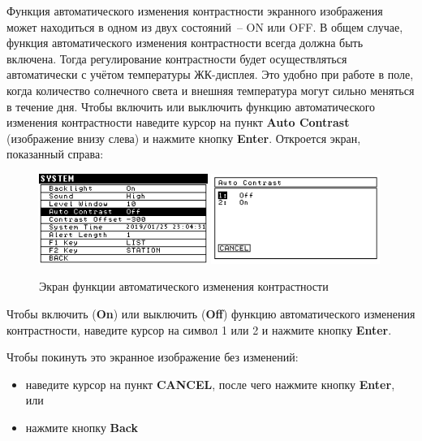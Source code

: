Функция автоматического изменения контрастности экранного изображения может
находиться в одном из двух состояний~-- ON или OFF. В общем случае, функция
автоматического изменения контрастности всегда должна быть включена. Тогда
регулирование контрастности будет осуществляться автоматически с учётом
температуры ЖК-дисплея. Это удобно при работе в поле, когда количество
солнечного света и внешняя температура могут сильно меняться в течение дня.
Чтобы включить или выключить функцию автоматического изменения контрастности
наведите курсор на пункт \textbf{Auto Contrast} (изображение внизу слева) и
нажмите кнопку \textbf{Enter}. Откроется экран, показанный справа:

\begin{figure}[H]
  \centering
  \includegraphics[width=0.49\textwidth]{figures/the_auto_contrast_screen_1}
  \includegraphics[width=0.49\textwidth]{figures/the_auto_contrast_screen_2}
  \caption{Экран функции автоматического изменения контрастности}
  \label{fig:the_auto_contrast_screen}
\end{figure}

Чтобы включить (\textbf{On}) или выключить (\textbf{Off}) функцию
автоматического изменения контрастности, наведите курсор на символ 1 или 2 и
нажмите кнопку \textbf{Enter}.

Чтобы покинуть это экранное изображение без изменений:
\begin{itemize}
  \item наведите курсор на пункт \textbf{CANCEL}, после чего нажмите кнопку
    \textbf{Enter}, или

  \item нажмите кнопку \textbf{Back}
\end{itemize}


